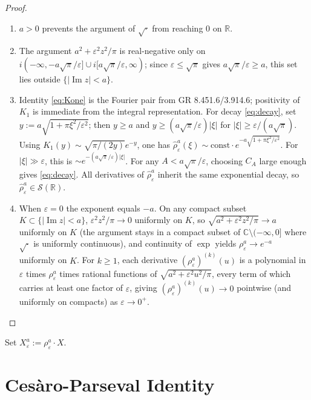 \documentclass[12pt]{amsart}
\theoremstyle{remark}
\begin{document}
\begin{proof}
\begin{enumerate}
\item[(i)] $a>0$ prevents the argument of $\sqrt{\cdot}$ from reaching $0$
on $\mathbb{R}$.
\item[(ii)] The argument $a^2+\varepsilon^2 z^2/\pi$ is real-negative only on
$i(-\infty,-a\sqrt{\pi}/\varepsilon]\cup i[a\sqrt{\pi}/\varepsilon,\infty)$;
since $\varepsilon\leq\sqrt{\pi}$ gives $a\sqrt{\pi}/\varepsilon\geq a$, this set
lies outside $\{|\operatorname{Im}z|<a\}$.
\item[(iii)] Identity \eqref{eq:Kone} is the Fourier pair from GR 8.451.6/3.914.6;
positivity of $K_1$ is immediate from the integral representation.
For decay \eqref{eq:decay}, set $y:=a\sqrt{1+\pi\xi^2/\varepsilon^2}$; then
$y\geq a$ and $y\geq(a\sqrt{\pi}/\varepsilon)|\xi|$ for $|\xi|\geq\varepsilon/(a\sqrt{\pi})$.
Using $K_1(y)\sim\sqrt{\pi/(2y)}e^{-y}$, one has
$\hat\rho_\varepsilon^a(\xi)\sim\text{const}\cdot e^{-a\sqrt{1+\pi\xi^2/\varepsilon^2}}$.
For $|\xi|\gg\varepsilon$, this is $\sim e^{-(a\sqrt{\pi}/\varepsilon)|\xi|}$.
For any $A<a\sqrt{\pi}/\varepsilon$, choosing $C_A$ large enough gives \eqref{eq:decay}.
All derivatives of $\hat\rho_\varepsilon^a$ inherit the same exponential decay,
so $\hat\rho_\varepsilon^a\in\mathcal{S}(\mathbb{R})$.
\item[(iv)] When $\varepsilon=0$ the exponent equals $-a$.  On any compact
subset $K\subset\{|\operatorname{Im}z|<a\}$, $\varepsilon^2 z^2/\pi\to 0$
uniformly on $K$, so $\sqrt{a^2+\varepsilon^2 z^2/\pi}\to a$ uniformly on $K$
(the argument stays in a compact subset of $\mathbb{C}\setminus(-\infty,0]$
where $\sqrt{\cdot}$ is uniformly continuous), and continuity of $\exp$
yields $\rho_\varepsilon^a\to e^{-a}$ uniformly on $K$.  For $k\geq 1$,
each derivative $(\rho_\varepsilon^a)^{(k)}(u)$ is a polynomial in
$\varepsilon$ times $\rho_\varepsilon^a$ times rational functions of
$\sqrt{a^2+\varepsilon^2 u^2/\pi}$, every term of which carries at least
one factor of $\varepsilon$, giving $(\rho_\varepsilon^a)^{(k)}(u)\to 0$
pointwise (and uniformly on compacts) as $\varepsilon\to 0^+$. \qedhere
\end{enumerate}
\end{proof}

Set $X_\varepsilon^a := \rho_\varepsilon^a\cdot X$.

\section{Cesàro-Parseval Identity}\label{sec:parseval}
\end{document}
